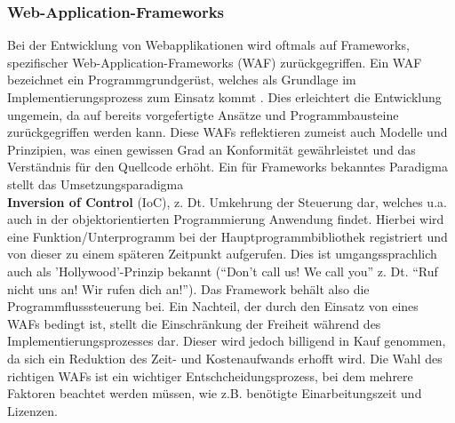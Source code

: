 \subsubsection{Web-Application-Frameworks} \label{sec:wafs}
Bei der Entwicklung von Webapplikationen wird oftmals auf Frameworks, spezifischer Web-Application-Frameworks (WAF) zurückgegriffen. 
Ein WAF bezeichnet ein Programmgrundgerüst, welches als Grundlage im Implementierungsprozess zum Einsatz kommt \cite{Ionis2019:online}. Dies erleichtert die Entwicklung ungemein, da auf bereits vorgefertigte Ansätze und Programmbausteine zurückgegriffen werden kann. Diese WAFs reflektieren zumeist auch Modelle und Prinzipien, was einen gewissen Grad an Konformität gewährleistet und das Verständnis für den Quellcode erhöht.
Ein für Frameworks bekanntes Paradigma stellt das Umsetzungsparadigma \\
\textbf{Inversion of Control} (IoC), z. Dt. Umkehrung der Steuerung dar, welches u.a. auch in der objektorientierten Programmierung Anwendung findet.
Hierbei wird eine Funktion/Unterprogramm bei der Hauptprogrammbibliothek registriert und von dieser zu einem späteren Zeitpunkt aufgerufen. Dies ist umgangssprachlich auch als 'Hollywood'-Prinzip bekannt ("`Don't call us! We call you"' z. Dt. "`Ruf nicht uns an! Wir rufen dich an!"'). Das Framework behält also die Programmflusssteuerung bei. 
  Ein Nachteil, der durch den Einsatz von eines WAFs bedingt ist, stellt die Einschränkung der Freiheit während des Implementierungsprozesses dar. Dieser wird jedoch billigend in Kauf genommen, da sich ein Reduktion des Zeit- und Kostenaufwands erhofft wird. Die Wahl des richtigen WAFs ist ein wichtiger Entschcheidungsprozess, bei dem mehrere Faktoren beachtet werden müssen, wie z.B. benötigte Einarbeitungszeit und Lizenzen.


